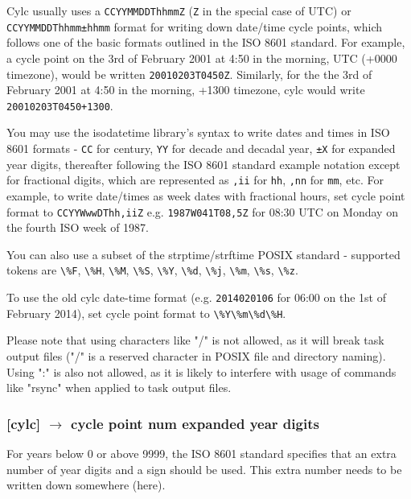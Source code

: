 Cylc usually uses a \lstinline=CCYYMMDDThhmmZ= (\lstinline=Z= in the special
case of UTC) or \lstinline=CCYYMMDDThhmm±hhmm= format for writing down
date/time cycle points, which follows one of the basic formats outlined in the
ISO 8601 standard. For example, a cycle point on the 3rd of February 2001 at
4:50 in the morning, UTC (+0000 timezone), would be written
\lstinline=20010203T0450Z=. Similarly, for the the 3rd of February 2001 at
4:50 in the morning, +1300 timezone, cylc would write
\lstinline=20010203T0450+1300=.

You may use the isodatetime library's syntax to write dates and times in ISO
8601 formats - \lstinline=CC= for century, \lstinline=YY= for decade and
decadal year, \lstinline=±X= for expanded year digits, thereafter following
the ISO 8601 standard example notation except for fractional digits, which are
represented as \lstinline=,ii= for \lstinline=hh=, \lstinline=,nn= for
\lstinline=mm=, etc. For example, to write date/times as week dates with
fractional hours, set cycle point format to \lstinline=CCYYWwwDThh,iiZ= e.g.
\lstinline=1987W041T08,5Z= for 08:30 UTC on Monday on the fourth ISO week of
1987.

You can also use a subset of the strptime/strftime POSIX standard - supported
tokens are \lstinline=\%F=, \lstinline=\%H=, \lstinline=\%M=, \lstinline=\%S=,
\lstinline=\%Y=, \lstinline=\%d=, \lstinline=\%j=, \lstinline=\%m=,
\lstinline=\%s=, \lstinline=\%z=.

To use the old cylc date-time format (e.g. \lstinline=2014020106= for 06:00
on the 1st of February 2014), set cycle point format to
\lstinline=\%Y\%m\%d\%H=.

Please note that using characters like "/" is not allowed, as it will break
task output files ("/" is a reserved character in POSIX file and directory
naming). Using ":" is also not allowed, as it is likely to interfere with
usage of commands like "rsync" when applied to task output files.

\subsubsection[cycle point num expanded year digits]{ [cylc] $\rightarrow$
cycle point num expanded year digits}
\label{cycle-point-num-expanded-year-digits}

For years below 0 or above 9999, the ISO 8601 standard specifies that an
extra number of year digits and a sign should be used. This extra number needs
to be written down somewhere (here).

